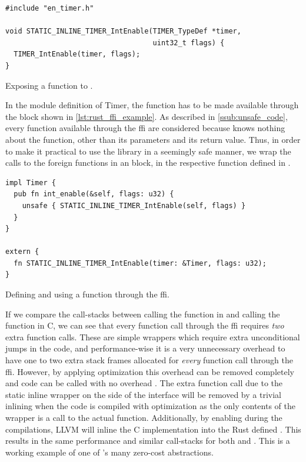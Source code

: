 \begin{listing}[h]
\begin{verbatim}
#include "en_timer.h"

void STATIC_INLINE_TIMER_IntEnable(TIMER_TypeDef *timer,
                                   uint32_t flags) {
  TIMER_IntEnable(timer, flags);
}
\end{verbatim}
\caption{Exposing a  function to {\rust}.}
\label{lst:exposing_static_inline}
\end{listing}

In the {\rust} module definition of Timer, the function has to be made available through the  block shown in \autoref{lst:rust_ffi_example}.
As described in \autoref{ssub:unsafe_code}, every function available through the \gls{ffi} are considered {\unsafe} because {\rust} knows nothing about the function, other than its parameters and its return value.
Thus, in order to make it practical to use the library in a seemingly safe manner, we wrap the calls to the foreign functions in an {\unsafe} block, in the respective function defined in {\rust}.

\begin{listing}[h]
\begin{verbatim}
impl Timer {
  pub fn int_enable(&self, flags: u32) {
    unsafe { STATIC_INLINE_TIMER_IntEnable(self, flags) }
  }
}

extern {
  fn STATIC_INLINE_TIMER_IntEnable(timer: &Timer, flags: u32);
}
\end{verbatim}
\caption{Defining and using a function through the {\rust} \gls{ffi}.}
\label{lst:rust_ffi_example}
\end{listing}

If we compare the call-stacks between calling the  function in {\rust} and calling the  function in C, we can see that every function call through the \gls{ffi} requires \emph{two} extra function calls.
These are simple wrappers which require extra unconditional jumps in the code, and performance-wise it is a very unnecessary overhead to have one to two extra stack frames allocated for \emph{every} function call through the \gls{ffi}.
However, by applying optimization this overhead can be removed completely and {\C} code can be called with no overhead \cite{web:rust_once_run_everywhere}.
The extra function call due to the static inline wrapper on the {\C} side of the interface will be removed by a trivial inlining when the code is compiled with optimization as the only contents of the wrapper is a call to the actual function.
Additionally, by enabling  during the compilations, LLVM will inline the C implementation into the Rust defined .
This results in the same performance and similar call-stacks for both {\C} and {\rust}.
This is a working example of one of {\rust}'s many zero-cost abstractions.

